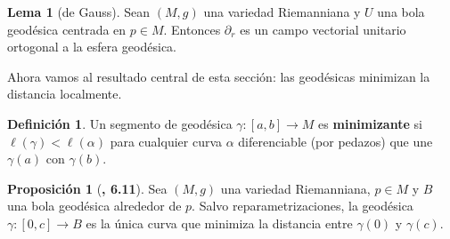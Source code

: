 \documentclass[spanish]{book}
\theoremstyle{definition}
\newtheorem*{defn}{Definición}
\newtheorem*{prop}{Proposición}
\newtheorem*{lema}{Lema}
\begin{document}
	\begin{lema}[de Gauss]
		Sean $(M,g)$ una variedad Riemanniana y $U$ una bola geodésica centrada en $p\in M$. Entonces $\partial_r$ es un campo vectorial unitario ortogonal a la esfera geodésica.
	\end{lema}
	
	Ahora vamos al resultado central de esta sección: las geodésicas minimizan la distancia localmente.
	
	\begin{defn}
		Un segmento de geodésica $\gamma:[a,b]\to M$ es \textbf{minimizante} si $\ell(\gamma)<\ell(\alpha)$ para cualquier curva $\alpha$ diferenciable (por pedazos) que une $\gamma(a)$ con $\gamma(b)$.
	\end{defn}
	
	\begin{prop}[\cite{Lee-riem}\textbf{, 6.11}]
		Sea $(M,g)$ una variedad Riemanniana, $p\in M$ y $B$ una bola geodésica alrededor de $p$. Salvo reparametrizaciones, la geodésica $\gamma:[0,c]\to B$ es la única curva que minimiza la distancia entre $\gamma(0)$ y $\gamma(c)$.
		
	\end{prop}
\end{document}
